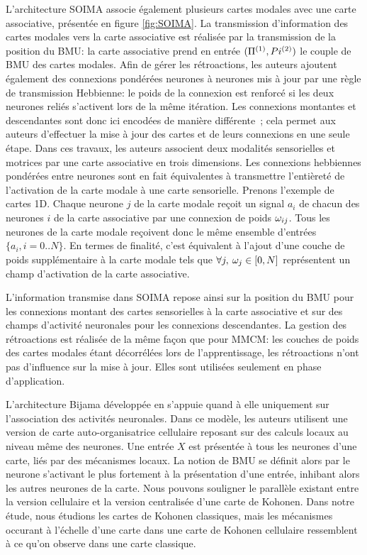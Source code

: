 \documentclass[../main]{subfiles}
\begin{document}
L'architecture SOIMA \cite{escobar-juarez_self-organized_2016} associe également plusieurs cartes modales avec une carte associative, présentée en figure \ref{fig:SOIMA}.
La transmission d'information des cartes modales vers la carte associative est réalisée par la transmission de la position du BMU: la carte associative prend en entrée $(\Pi^{({1})},Pi^{({2})})$ le couple de BMU des cartes modales. 
Afin de gérer les rétroactions, les auteurs ajoutent également des connexions pondérées neurones à neurones mis à jour par une règle de transmission Hebbienne: le poids de la connexion est renforcé si les deux neurones reliés s'activent lors de la même itération.
Les connexions montantes et descendantes sont donc ici encodées de manière différente~; cela permet aux auteurs d'effectuer la mise à jour des cartes et de leurs connexions en une seule étape. Dans ces travaux, les auteurs associent deux modalités sensorielles et motrices par une carte associative en trois dimensions.
Les connexions hebbiennes pondérées entre neurones sont en fait équivalentes à transmettre l'entièreté de l'activation de la carte modale à une carte sensorielle.
Prenons l'exemple de cartes 1D.
Chaque neurone $j$ de la carte modale reçoit un signal $a_{i}$ de chacun des neurones $i$ de la carte associative par une connexion de poids $\omega_{ij}$. Tous les neurones de la carte modale reçoivent donc le même ensemble d'entrées $ \{a_{i}, i = 0 .. N\}$.
En termes de finalité, c'est équivalent à l'ajout d'une couche de poids supplémentaire à la carte modale tels que $\forall j, \: \omega_j \in [0,N]$ représentent un champ d'activation de la carte associative.


L'information transmise dans SOIMA repose ainsi sur la position du BMU pour les connexions montant des cartes sensorielles à la carte associative et sur des champs d'activité neuronales pour les connexions descendantes.
La gestion des rétroactions est réalisée de la même façon que pour MMCM: les couches de poids des cartes modales étant décorrélées lors de l'apprentissage, les rétroactions n'ont pas d'influence sur la mise à jour. Elles sont utilisées seulement en phase d'application.

L'architecture Bijama développée en \cite{menard05,khouzam_2013} s'appuie quand à elle uniquement sur l'association des activités neuronales. Dans ce modèle, les auteurs utilisent une version de carte auto-organisatrice cellulaire reposant sur des calculs locaux au niveau même des neurones. 
Une entrée $X$ est présentée à tous les neurones d'une carte, liés par des mécanismes locaux. La notion de BMU se définit alors par le neurone s'activant le plus fortement à la présentation d'une entrée, inhibant alors les autres neurones de la carte.
Nous pouvons souligner le parallèle existant entre la version cellulaire et la version centralisée d'une carte de Kohonen. Dans notre étude, nous étudions les cartes de Kohonen classiques, mais les mécanismes occurant à l'échelle d'une carte dans une carte de Kohonen cellulaire ressemblent à ce qu'on observe dans une carte classique.
\end{document}

